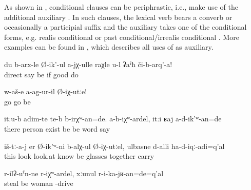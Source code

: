 As shown in , conditional clauses can be periphrastic, i.e., make use of the additional auxiliary   . In such clauses, the lexical verb bears a converb or occasionally a participial suffix and the auxiliary  takes one of the conditional forms, e.g. realis conditional  or past conditional\slash irrealis conditional . More examples can be found in , which describes all uses of  as auxiliary.
%
\begin{exe}
	\ex	\label{ex:‎If I do not tell it correctly, correct me!}
	\gll	du	b-arx-le	Ø-ik'-ul	a-jχ-ulle	raχle	u-l	ʡaˁħ	či-b-arq'-a!	\\
			direct	say	be	if		good	do	\\
	\glt	{}

	\ex	\label{ex:Let's go if you did not go there!}
	\gll	w-aš-e	a-ag-ur-il	Ø-iχ-utːe!\\
		go	go	be\\
	\glt	{}

	\ex	\label{ex:There must have been people there}
	\gll	itːu-b	adim-te	te-b	b-irχʷ-an=de.	a-b-iχʷ-ardel,	itːi	ʁaj	a-d-ik'ʷ-an=de\\
		there	person	exist	be		be		word	say\\
	\glt	{}

	\ex	\label{ex:‎If I (masc.) had known that I will look at them, I had brought my glasses}
	\gll	iš-tː-a-j	er	Ø-ik'ʷ-ni	b-alχ-ul	Ø-iχ-utːel,	ulbasne d-alli	ha-d-iqː-adi=q'al\\
		this	look	look.at	know	be	glasses	together	carry\\
	\glt	{}

	\ex	\label{ex:If the woman had stolen, they would/should have imprisoned her}
	\gll	r-ilʡ-uˁn-ne	r-iχʷ-ardel,	xːunul	r-i-ka-jʁ-an=de=q'al\\
		steal	be	woman	 -drive\\
	\glt	{}
\end{exe}


